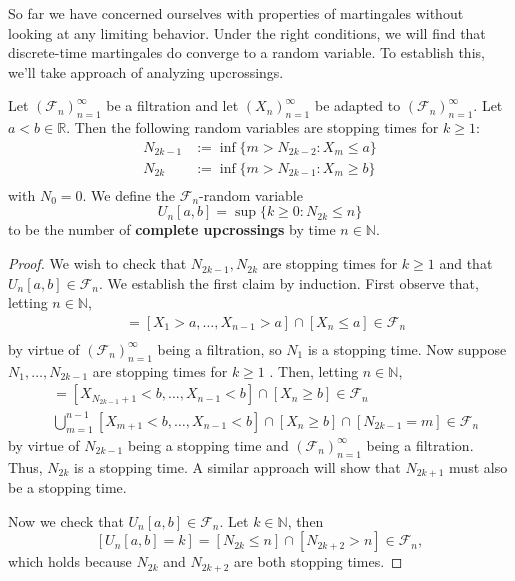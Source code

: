 So far we have concerned ourselves with properties of martingales without looking at any limiting behavior. Under the right conditions, we will find that discrete-time martingales do converge to a random variable. To establish this, we'll take approach of analyzing upcrossings.

\begin{proposition}
    Let $(\mathcal{F}_{n})_{n=1}^{\infty}$ be a filtration and let $(X_{n})_{n=1}^{\infty}$ be adapted to $(\mathcal{F}_{n})_{n=1}^{\infty}$. Let $a < b \in \mathbb{R}$. Then the following random variables are stopping times for $k \geq 1$:
    \begin{align*}
        N_{2k-1} &:= \inf\limits \{m > N_{2k-2} : X_{m} \leq a\}\\
        N_{2k} &:= \inf\limits \{m > N_{2k-1} : X_{m} \geq b\}\\
    \end{align*}
    with \(N_{0} = 0\). We define the $\mathcal{F}_{n}$-random variable 
    $$U_{n}[a,b] = \sup\limits \{k \geq 0 : N_{2k} \leq n\}$$
    to be the number of \textbf{complete upcrossings} by time $n \in \mathbb{N}$.
\end{proposition}

\begin{proof}
    We wish to check that \(N_{2k-1}, N_{2k}\) are stopping times for \(k \geq 1\) and that \(U_{n}[a,b] \in \mathcal{F}_{n}\). We establish the first claim by induction. First observe that, letting $n \in \mathbb{N}$,
    \begin{align*}
        [N_{1} = n] &= [X_{1} > a, \dots, X_{n-1} > a] \cap [X_{n} \leq a] \in \mathcal{F}_{n}\\
    \end{align*}
    by virtue of $(\mathcal{F}_{n})_{n=1}^{\infty}$ being a filtration, so $N_{1}$ is a stopping time. Now suppose $N_{1}, \dots, N_{2k-1}$ are stopping times for $k \geq 1$ . Then, letting $n \in \mathbb{N}$,
    \begin{align*}
        [N_{2k} = n] &= [X_{N_{2k-1}+1} < b, \dots, X_{n-1} < b] \cap [X_{n} \geq b] \in \mathcal{F}_{n}\\
        &\bigcup\limits_{m = 1}^{n-1} [X_{m+1} < b, \dots, X_{n-1} < b] \cap [X_{n} \geq b] \cap [N_{2k-1} = m] \in \mathcal{F}_{n}
    \end{align*}
    by virtue of $N_{2k-1}$ being a stopping time and $(\mathcal{F}_{n})_{n=1}^{\infty}$ being a filtration. Thus, $N_{2k}$ is a stopping time. A similar approach will show that $N_{2k+1}$ must also be a stopping time.
    
    Now we check that $U_{n}[a,b] \in \mathcal{F}_{n}$. Let $k \in \mathbb{N}$, then 
    $$[U_{n}[a,b] = k] = [N_{2k} \leq n] \cap [N_{2k+2} > n] \in \mathcal{F}_{n},$$
    which holds because $N_{2k}$ and $N_{2k+2}$ are both stopping times.
\end{proof}

